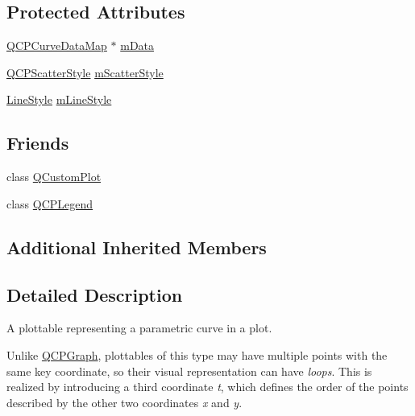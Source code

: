 \subsection*{Protected Attributes}
\begin{DoxyCompactItemize}
\item 
\hyperlink{qcustomplot_8h_a444d37ec9cb2951b3a7fe443c34d1658}{Q\-C\-P\-Curve\-Data\-Map} $\ast$ \hyperlink{class_q_c_p_curve_a88d533e455bca96004b049e99168731b}{m\-Data}
\item 
\hyperlink{class_q_c_p_scatter_style}{Q\-C\-P\-Scatter\-Style} \hyperlink{class_q_c_p_curve_a08f803b4a30b01bbd7a1eab15d0f864f}{m\-Scatter\-Style}
\item 
\hyperlink{class_q_c_p_curve_a2710e9f79302152cff794c6e16cc01f1}{Line\-Style} \hyperlink{class_q_c_p_curve_ae1f35ae2b15aee8e15bcdfec5be95156}{m\-Line\-Style}
\end{DoxyCompactItemize}
\subsection*{Friends}
\begin{DoxyCompactItemize}
\item 
class \hyperlink{class_q_c_p_curve_a1cdf9df76adcfae45261690aa0ca2198}{Q\-Custom\-Plot}
\item 
class \hyperlink{class_q_c_p_curve_a8429035e7adfbd7f05805a6530ad5e3b}{Q\-C\-P\-Legend}
\end{DoxyCompactItemize}
\subsection*{Additional Inherited Members}


\subsection{Detailed Description}
A plottable representing a parametric curve in a plot. 



Unlike \hyperlink{class_q_c_p_graph}{Q\-C\-P\-Graph}, plottables of this type may have multiple points with the same key coordinate, so their visual representation can have {\itshape loops}. This is realized by introducing a third coordinate {\itshape t}, which defines the order of the points described by the other two coordinates {\itshape x} and {\itshape y}.

